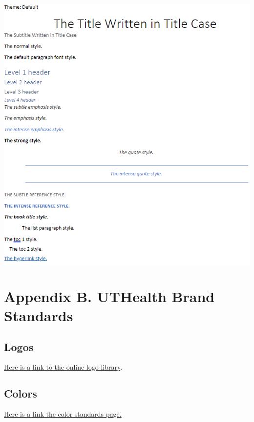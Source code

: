 \documentclass[
  letterpaper,
  DIV=11,
  numbers=noendperiod]{scrreprt}
\begin{document}
\begin{center}
\includegraphics[width=3\textwidth,height=\textheight]{chapters/style_guide/../../graphics/style_cheat_sheet.png}
\end{center}

\section{Appendix B. UTHealth Brand
Standards}\label{appendix-b.-uthealth-brand-standards}

\subsection{Logos}\label{logos}

\href{https://www.uth.edu/brand-standards/visual-identity/index.htm}{Here
is a link to the online logo library}.

\subsection{Colors}\label{colors}

\href{https://www.uth.edu/brand-standards/visual-identity/color}{Here is
a link the color standards page.}
\end{document}
